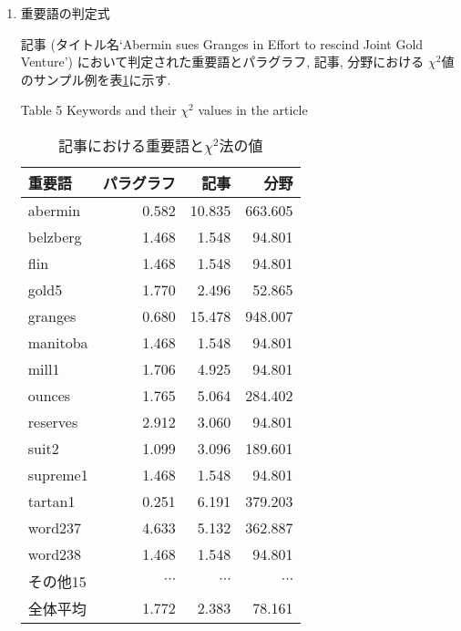\begin{enumerate}

\item 重要語の判定式


記事 (タイトル名`Abermin sues Granges in Effort to rescind Joint Gold
Venture') において判定された重要語とパラグラフ, 記事, 分野における
$\chi^2$値のサンプル例を表\ref{bbk5_2}に示す.

{\footnotesize
\begin{table}[htbp]
\begin{center}
\caption{記事における重要語と$\chi^2$法の値} \label{bbk5_2}
Table 5 Keywords and their $\chi^2$ values in the article \\
\begin{tabular}{lrrr} \hline \hline
重要語 &パラグラフ &記事 &分野 \\ \hline
abermin &0.582 &10.835 &663.605 \\
belzberg &1.468 &1.548 &94.801 \\
flin &1.468 &1.548 &94.801 \\
gold5 &1.770 &2.496 &52.865 \\
granges &0.680 &15.478 &948.007 \\
manitoba &1.468 &1.548 &94.801 \\
mill1 &1.706 &4.925 &94.801 \\
ounces &1.765 &5.064 &284.402 \\
reserves &2.912 &3.060 &94.801 \\
suit2 &1.099 &3.096 &189.601 \\
supreme1 &1.468 &1.548 &94.801 \\
tartan1 &0.251 &6.191 &379.203 \\
{\sf word237} &4.633 &5.132 &362.887 \\
{\sf word238} &1.468 &1.548 &94.801 \\ 
その他15 &$\cdots$ &$\cdots$ &$\cdots$ \\ \hline
全体平均 &1.772 &2.383 &78.161 \\ \hline
\end{tabular}
\end{center}
\end{table}
}


\end{enumerate}
